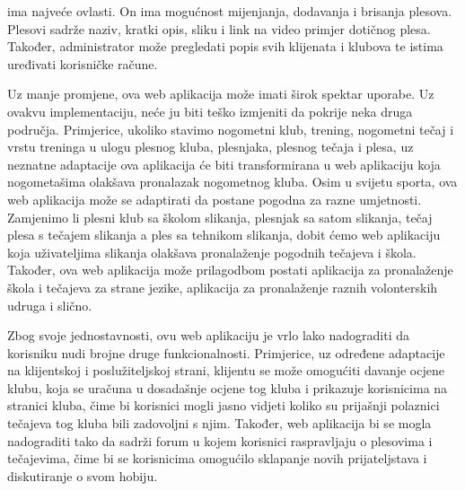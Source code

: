 \noindent {} ima najveće ovlasti. On ima mogućnost mijenjanja, dodavanja i brisanja plesova. Plesovi sadrže naziv, kratki opis, sliku i link na video primjer dotičnog plesa. Također, administrator može pregledati popis svih klijenata i klubova te istima uređivati korisničke račune.

\noindent Uz manje promjene, ova web aplikacija može imati širok spektar uporabe. Uz ovakvu implementaciju, neće ju biti teško izmjeniti da pokrije neka druga područja. Primjerice, ukoliko stavimo nogometni klub, trening, nogometni tečaj i vrstu treninga u ulogu plesnog kluba, plesnjaka, plesnog tečaja i plesa, uz neznatne adaptacije ova aplikacija će biti transformirana u web aplikaciju koja nogometašima olakšava pronalazak nogometnog kluba. Osim u svijetu sporta, ova web aplikacija može se adaptirati da postane pogodna za razne umjetnosti. Zamjenimo li plesni klub sa školom slikanja, plesnjak sa satom slikanja, tečaj plesa s tečajem slikanja a ples sa tehnikom slikanja, dobit ćemo web aplikaciju koja uživateljima slikanja olakšava pronalaženje pogodnih tečajeva i škola. Također, ova web aplikacija može prilagodbom postati aplikacija za pronalaženje škola i tečajeva za strane jezike, aplikacija za pronalaženje raznih volonterskih udruga i slično.

\noindent Zbog svoje jednostavnosti, ovu web aplikaciju je vrlo lako nadograditi da korisniku nudi brojne druge funkcionalnosti. Primjerice, uz određene adaptacije na klijentskoj i poslužiteljskoj strani, klijentu se može omogućiti davanje ocjene klubu, koja se uračuna u dosadašnje ocjene tog kluba i prikazuje korisnicima na stranici kluba, čime bi korisnici mogli jasno vidjeti koliko su prijašnji polaznici tečajeva tog kluba bili zadovoljni s njim. Također, web aplikacija bi se mogla nadograditi tako da sadrži forum u kojem korisnici raspravljaju o plesovima i tečajevima, čime bi se korisnicima omogućilo sklapanje novih prijateljstava i diskutiranje o svom hobiju.		
	
